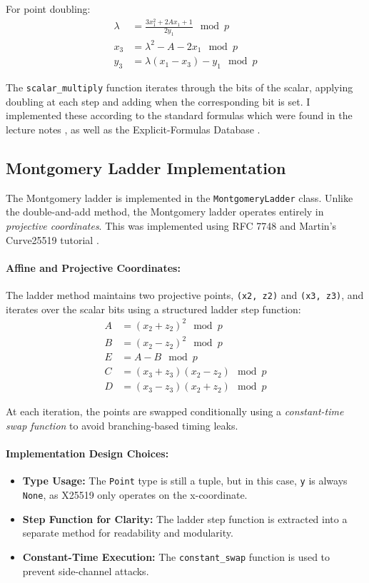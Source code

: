 \documentclass[twoside,a4paper,12pt]{article}
\begin{document}
For point doubling:
\begin{align}
    \lambda &= \frac{3x_1^2 + 2Ax_1 + 1}{2y_1} \mod p \\
    x_3 &= \lambda^2 - A - 2x_1 \mod p \\
    y_3 &= \lambda (x_1 - x_3) - y_1 \mod p
\end{align}

The \texttt{scalar\_multiply} function iterates through the bits of the scalar, applying doubling at each step and adding when the corresponding bit is set. I implemented these according to the standard formulas which were found in the lecture notes \cite{P79LectureNotes}, as well as the Explicit-Formulas Database \cite{hyperellipticEFDMG}.

\subsection{Montgomery Ladder Implementation}
\label{subsec:x25519_montgomery_ladder}

The Montgomery ladder is implemented in the \texttt{MontgomeryLadder} class. Unlike the double-and-add method, the Montgomery ladder operates entirely in \textit{projective coordinates}. This was implemented using RFC
7748 \cite{rfc7748} and Martin's Curve25519 tutorial \cite{Kleppmann2020}.
\paragraph{Affine and Projective Coordinates:} The ladder method maintains two projective points, \texttt{(x2, z2)} and \texttt{(x3, z3)}, and iterates over the scalar bits using a structured ladder step function:
\begin{align}
    A &= (x_2 + z_2)^2 \mod p \\
    B &= (x_2 - z_2)^2 \mod p \\
    E &= A - B \mod p \\
    C &= (x_3 + z_3) (x_2 - z_2) \mod p \\
    D &= (x_3 - z_3) (x_2 + z_2) \mod p
\end{align}

At each iteration, the points are swapped conditionally using a \textit{constant-time swap function} to avoid branching-based timing leaks.

\paragraph{Implementation Design Choices:}
\begin{itemize}
    \item \textbf{Type Usage:} The \texttt{Point} type is still a tuple, but in this case, \texttt{y} is always \texttt{None}, as X25519 only operates on the x-coordinate.
    \item \textbf{Step Function for Clarity:} The ladder step function is extracted into a separate method for readability and modularity.
    \item \textbf{Constant-Time Execution:} The \texttt{constant\_swap} function is used to prevent side-channel attacks.
\end{itemize}
\end{document}
